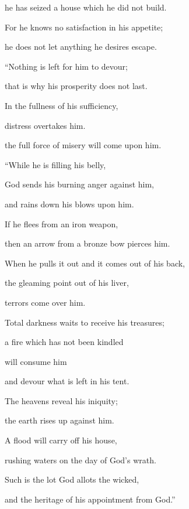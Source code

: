 {\par }{\Q he has seized
a house
which he did not
build.
\par }{\Q {}For
he knows
no
satisfaction
in his appetite;
\par }{\Q he does not
let anything he desires
escape.
\par }{\Q {}“Nothing
is left
for him to devour;
\par }{\Q that is why
his prosperity
does not
last.
\par }{\Q {}In the fullness
of his sufficiency,
\par }{\Q distress overtakes him.
\par }{\Q the full force
of misery
will come upon him.
\par }{\Q {}“While
he is filling
his belly,
\par }{\Q God sends
his burning
anger
against him,
\par }{\Q and rains down
his blows upon him.
\par }{\Q {}If
he flees
from an iron
weapon,
\par }{\Q then an arrow from a bronze
bow
pierces him.
\par }{\Q {}When he pulls
it out
and it comes out of his back,
\par }{\Q the gleaming
point out of his liver,
\par }{\Q terrors
come
over him.
\par }{\Q {}Total
darkness
waits
to receive his treasures;
\par }{\Q a fire
which has not
been kindled
\par }{\Q will consume
him
\par }{\Q and devour
what is left
in his tent.
\par }{\Q {}The heavens
reveal
his iniquity;
\par }{\Q the earth
rises up against him.
\par }{\Q {}A flood
will carry
off his house,
\par }{\Q rushing
waters on the day
of God’s wrath.
\par }{\Q {}Such
is the lot God
allots the wicked,
\par }{\Q and the heritage
of his appointment
from God.”


\par }
